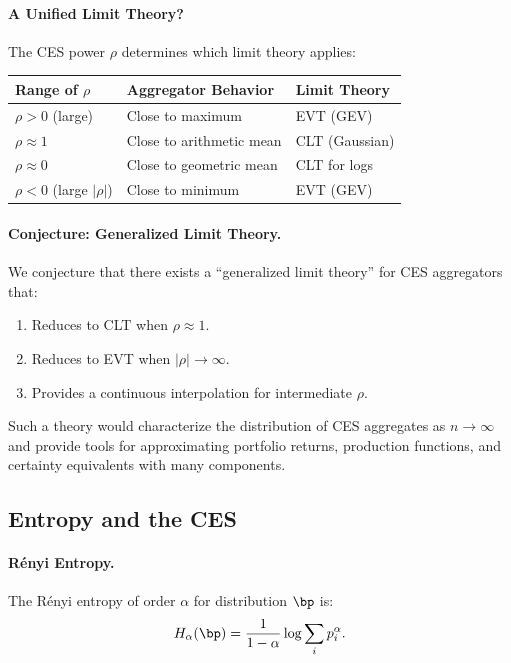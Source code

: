 \paragraph{A Unified Limit Theory?}
The CES power $\rho$ determines which limit theory applies:
\begin{center}
\begin{tabular}{@{}lll@{}}
\toprule
\textbf{Range of $\rho$} & \textbf{Aggregator Behavior} & \textbf{Limit Theory} \\
\midrule
$\rho > 0$ (large) & Close to maximum & EVT (GEV) \\
$\rho \approx 1$ & Close to arithmetic mean & CLT (Gaussian) \\
$\rho \approx 0$ & Close to geometric mean & CLT for logs \\
$\rho < 0$ (large $|\rho|$) & Close to minimum & EVT (GEV) \\
\bottomrule
\end{tabular}
\end{center}

\paragraph{Conjecture: Generalized Limit Theory.}
We conjecture that there exists a ``generalized limit theory'' for CES aggregators that:
\begin{enumerate}[nosep]
\item Reduces to CLT when $\rho \approx 1$.
\item Reduces to EVT when $|\rho| \to \infty$.
\item Provides a continuous interpolation for intermediate $\rho$.
\end{enumerate}

Such a theory would characterize the distribution of CES aggregates as $n \to \infty$ and provide tools for approximating portfolio returns, production functions, and certainty equivalents with many components.

\subsection{Entropy and the CES}
\label{subsec:ac-adv-entropy}

\paragraph{Rényi Entropy.}
The Rényi entropy of order $\alpha$ for distribution $\bp$ is:
\begin{equation}
H_\alpha(\bp) = \frac{1}{1-\alpha} \log \sum_i p_i^\alpha.
\label{eq:ac-adv-renyi}
\end{equation}

